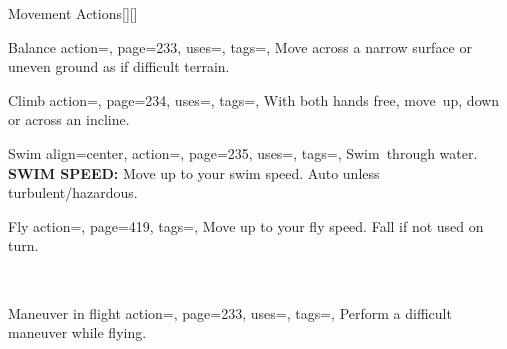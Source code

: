 \begin{PageBack}
\begin{Tables}{\backTableHeight}
\begin{Table}{Movement Actions}[][]
\begin{entry}{Balance}{%
                action=,
                page=233,
                uses=\Acrobatics,
                tags=\Move,
            }
                Move across a narrow surface or uneven ground as if difficult terrain.\hfill {}\quad {}
            \end{entry}
            \begin{entry}{Climb}{%
                action=,
                page=234,
                uses=\Athletics,
                tags=\Move,
            }
                With both hands free, move \,\Feet up, down or across an incline.\hfill {}
            \end{entry}
            \begin{entry}{Swim}{%
                align=center,
                action=,
                page=235,
                uses=\Athletics,
                tags=\Move,
            }
                Swim \,\Feet through water.  \hfill { \hfill {}\hfill }\\%
                 \hfill \textbf{SWIM SPEED:} Move up to your swim
                speed. Auto
                 unless turbulent/hazardous.
            \end{entry}
            \breakLine
            \begin{entry}{Fly}{%
                action=,
                page=419,
                tags=\Move,
            }
                Move up to your fly speed. Fall if not used on turn. \hfill
                \parbox{0.5\linewidth}{\raggedleft
                \\
                }%
            \end{entry}
            \begin{entry}{Maneuver in flight}{%
                action=,
                page=233,
                uses={\Acrobatics[tags={T}]},
                tags=\Move,
            }
                Perform a difficult maneuver while flying.\hfill {}\quad

\end{entry}
\end{Table}
\end{Tables}
\end{PageBack}
